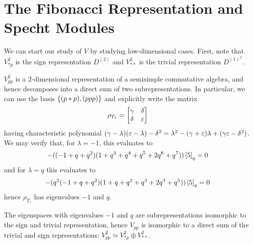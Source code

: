 \documentclass{amsart}
\begin{document}
\section{The Fibonacci Representation and Specht Modules}
We can start our study of $V$ by studying low-dimensional cases.
First, note that $V_{*p}^2$ is the sign representation $D^{(2)}$ and $V_{**}^2$ is the trivial representation $D^{(1)^2}$.

$V_{pp}^2$ is a 2-dimensional representation of a semisimple commutative algebra, and hence decomposes into a direct sum of two subrepresentations.
In particular, we can use the basis $\left\{ (p*p),(ppp) \right\}$ and explicitly write the matrix
\[
  \rho_{T_1} = \begin{bmatrix}
    \gamma & \delta\\
    \delta & \varepsilon
  \end{bmatrix}
\]
having characteristic polynomial $(\gamma - \lambda)(\varepsilon - \lambda) - \delta^2 = \lambda^2 - (\gamma + \varepsilon)\lambda +(\gamma\varepsilon - \delta^2)$.
We may verify that, for $\lambda = -1$, this evaluates to
\[
  -((-1 + q + q^2) (1 + q^3 + q^4 + q^5 + 2 q^6 + q^7))\left[ 5 \right]_q = 0
\]
and for $\lambda = q$ this evaluates to 
\[
-(q^2 (-1 + q + q^2) (1 + q + q^2 + q^3 + 2 q^4 + q^5)) \left[ 5 \right]_q = 0
\]
hence $\rho_{T_1}$ has eigenvalues $-1$ and $q$.

The eigenspaces with eigenvalues $-1$ and $q$ are subrepresentations isomorphic to the sign and trivial representation, hence $V_{pp}$ is isomorphic to a direct sum of the trivial and sign representations: $V^2_{pp} \simeq V^2_{*p} \oplus V^2_{**}$. 
\end{document}
